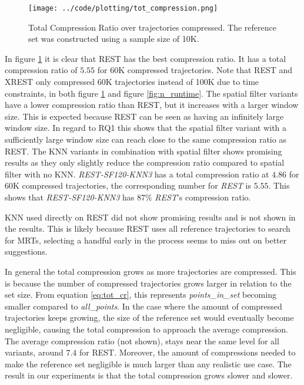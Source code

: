 \begin{figure}[h]
    \begin{minipage}{0.99\linewidth}
        \centering
        \texttt{[image: ../code/plotting/tot\_compression.png]}
        \caption{Total Compression Ratio over trajectories compressed. The reference set was constructed using a sample size of 10K.}
        \label{fig:n_compression}
    \end{minipage}
\end{figure}

In figure \ref{fig:n_compression} it is clear that REST has the best compression ratio. It has a total compression ratio of $5.55$ for 60K compressed trajectories. Note that REST and XREST only compressed 60K trajectories instead of 100K due to time constraints, in both figure \ref{fig:n_compression} and figure \ref{fig:n_runtime}. The spatial filter variants have a lower compression ratio than REST, but it increases with a larger window size. This is expected because REST can be seen as having an infinitely large window size. In regard to RQ1 this shows that the spatial filter variant with a sufficiently large window size can reach close to the same compression ratio as REST. The KNN variants in combination with spatial filter shows promising results as they only slightly reduce the compression ratio compared to spatial filter with no KNN. \textit{REST-SF120-KNN3} has a total compression ratio at $4.86$ for 60K compressed trajectories, the corresponding number for \textit{REST} is $5.55$. This shows that \textit{REST-SF120-KNN3} has 87\% \textit{REST}'s compression ratio.

KNN used directly on REST did not show promising results and is not shown in the results. This is likely because REST uses all reference trajectories to search for MRTs, selecting a handful early in the process seems to miss out on better suggestions.

In general the total compression grows as more trajectories are compressed. This is because the number of compressed trajectories grows larger in relation to the set size. From equation \ref{eq:tot_cr}, this represents \textit{points\_in\_set} becoming smaller compared to \textit{all\_points}. In the case where the amount of compressed trajectories keeps growing, the size of the reference set would eventually become negligible, causing the total compression to approach the average compression. The average compression ratio (not shown), stays near the same level for all variants, around $7.4$ for REST. Moreover, the amount of compressions needed to make the reference set negligible is much larger than any realistic use case. The result in our experiments is that the total compression grows slower and slower.

